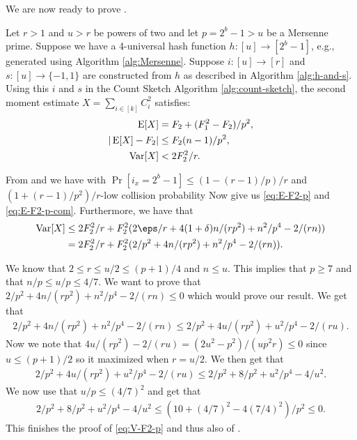 We are now ready to prove .
\begingroup
    \def\thelemma{\ref{thm:h-and-s-p}}
    \begin{theorem}
        Let $r>1$ and $u>r$ be powers of two and let $p=2^b-1>u$ be a
        Mersenne prime.
        Suppose we have a 4-universal hash function $h:[u]\to[2^b-1]$, e.g.,
        generated using Algorithm \ref{alg:Mersenne}. Suppose
        $i:[u]\to[r]$ and
        $s:[u]\to\{-1,1\}$ are constructed from $h$ as described in
        Algorithm \ref{alg:h-and-s}. Using this $i$ and $s$ 
        in the Count Sketch Algorithm \ref{alg:count-sketch}, the second moment 
        estimate $X=\sum_{i\in[k]} C_i^2$ satisfies:
        \begin{align}
           \operatorname*{E}[X] &= F_2+(F_1^2-F_2)/p^2, \label{eq:E-F2-p}\\
           | \operatorname*{E}[X] - F_2 | &\le F_2 (n - 1)/p^2, \label{eq:E-F2-p-com}\\
           \operatorname*{Var}[X]&< 2F_2^2/r.\label{eq:V-F2-p}
        \end{align}
    \end{theorem}
    \addtocounter{lemma}{-1}
\endgroup

From  and  we have
 with $
    \Pr[i_x = 2^b - 1] \le (1 - (r - 1)/p)/r$
   and  $(1 + (r - 1)/p^2)/r$-low collision probability
Now  give us \eqref{eq:E-F2-p}
and \eqref{eq:E-F2-p-com}. Furthermore, we have that
\begin{align*}
    \Var[X] 
        &\le 2F_2^2/r + F_2^2 (2\eps/r + 4(1 + \delta)n / (rp^2) + n^2/p^4 - 2 /(rn))
        \\&= 2F_2^2/r + F_2^2(2/p^2 + 4n/(r p^2) + n^2/p^4 - 2/(rn)) .
\end{align*}

We know that $2 \le r \le u/2 \le (p + 1)/4$ and $n \le u$.
This implies that $p \ge 7$ and that $n/p \le u/p \le 4/7$.
We want to prove that
$2/p^2 + 4n/(r p^2) + n^2/p^4 - 2/(rn) \le 0$ which would
prove our result. We get that
\begin{align*}
    2/p^2 + 4n/(r p^2) + n^2/p^4 - 2/(rn)
        \le 2/p^2 + 4u/(r p^2) + u^2/p^4 - 2/(ru) .
\end{align*}
Now we note that $4u/(r p^2) - 2/(ru) = (2u^2 - p^2)/(u p^2 r) \le 0$
since $u \le (p + 1)/2$ so it maximized when $r = u/2$. We then get
that
\begin{align*}
    2/p^2 + 4u/(r p^2) + u^2/p^4 - 2/(ru)
        \le 2/p^2 + 8/p^2 + u^2 / p^4 - 4/u^2 .
\end{align*}
We now use that $u/p \le (4/7)^2$ and get that
\begin{align*}
    2/p^2 + 8/p^2 + u^2 / p^4 - 4/u^2
        \le (10 + (4/7)^2 - 4 (7/4)^2)/p^2
        \le 0 .
\end{align*}
This finishes the proof of \eqref{eq:V-F2-p} and thus also of .
